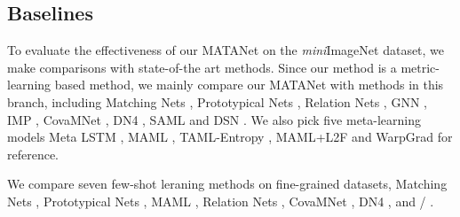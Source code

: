 \documentclass[final]{cvpr}
\begin{document}
	
	
	
	\subsection{Baselines}
	To evaluate the effectiveness of our MATANet on the \emph{mini}ImageNet dataset, we make comparisons with state-of-the art methods. Since our method is a metric-learning based method, we mainly compare our MATANet with methods in this branch, including Matching Nets \cite{vinyals2016matching}, Prototypical Nets \cite{snell2017prototypical}, Relation Nets \cite{sung2018learning}, GNN \cite{garcia2017few}, IMP \cite{allen2019infinite}, CovaMNet \cite{li2019distribution}, DN4 \cite{li2019revisiting}, SAML\cite{hao2019collect} and DSN \cite{simon2020adaptive} . We also pick five meta-learning models Meta LSTM \cite{ravi2016optimization}, MAML \cite{finn2017model}, TAML-Entropy \cite{jamal2019task}, MAML+L2F \cite{baik2020learning} and WarpGrad \cite{flennerhag2019meta} for reference. 
	
	We compare seven few-shot leraning methods on fine-grained datasets, Matching Nets \cite{vinyals2016matching}, Prototypical Nets \cite{snell2017prototypical}, MAML \cite{finn2017model}, Relation Nets  \cite{sung2018learning}, CovaMNet \cite{li2019distribution}, DN4 \cite{li2019revisiting}, and / \cite{huang2020low}. 
	
	
	
\end{document}
